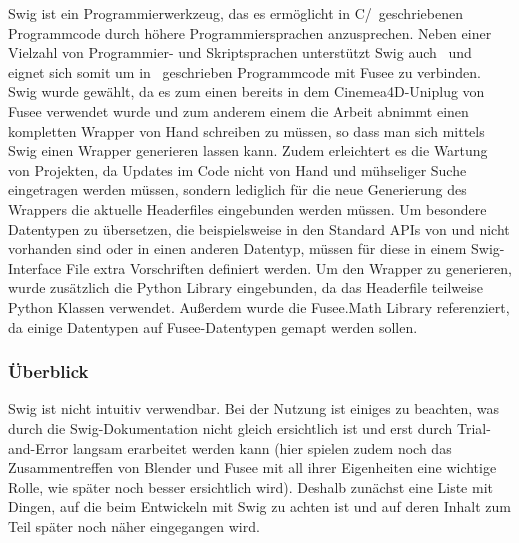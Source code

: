 \label{sec:SWIG}

Swig ist ein Programmierwerkzeug, das es ermöglicht in C/\CC~geschriebenen Programmcode durch höhere Programmiersprachen anzusprechen. Neben einer Vielzahl von Programmier- und Skriptsprachen unterstützt Swig auch \CS~und eignet sich somit um in \CC~geschrieben Programmcode mit Fusee zu verbinden. Swig wurde gewählt, da es zum einen bereits in dem Cinemea4D-Uniplug von Fusee verwendet wurde und zum anderem einem die Arbeit abnimmt einen kompletten Wrapper von Hand schreiben zu müssen, so dass man sich mittels Swig einen Wrapper generieren lassen kann. Zudem erleichtert es die Wartung von Projekten, da Updates im Code nicht von Hand und mühseliger Suche eingetragen werden müssen, sondern lediglich für die neue Generierung des Wrappers die aktuelle Headerfiles eingebunden werden müssen. Um besondere Datentypen zu übersetzen, die beispielsweise in den Standard APIs von \CC und \CS nicht vorhanden sind oder in einen anderen Datentyp, müssen für diese in einem Swig-Interface File extra Vorschriften definiert werden.
Um den Wrapper zu generieren, wurde zusätzlich die Python Library eingebunden, da das Headerfile teilweise Python Klassen verwendet. Außerdem wurde die Fusee.Math Library referenziert, da einige Datentypen auf Fusee-Datentypen gemapt werden sollen.

\subsubsection{Überblick}
Swig ist nicht intuitiv verwendbar. Bei der Nutzung ist einiges zu beachten, was durch die Swig-Dokumentation nicht gleich ersichtlich ist und erst durch Trial-and-Error langsam erarbeitet werden kann (hier spielen zudem noch das Zusammentreffen von Blender und Fusee mit all ihrer Eigenheiten eine wichtige Rolle, wie später noch besser ersichtlich wird). Deshalb zunächst eine Liste mit Dingen, auf die beim Entwickeln mit Swig zu achten ist und auf deren Inhalt zum Teil später noch näher eingegangen wird.

